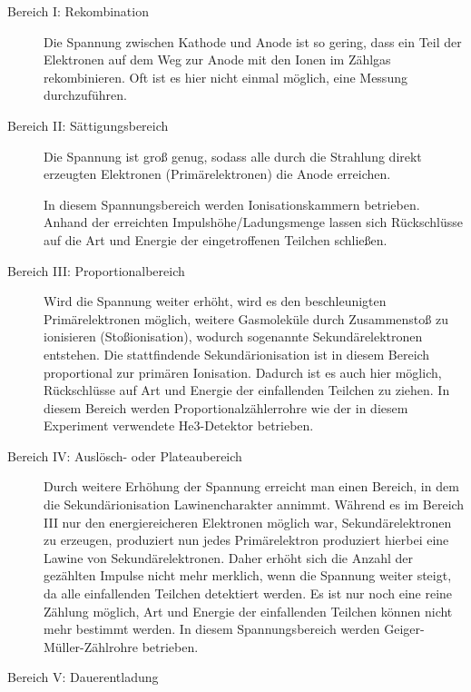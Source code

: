 \begin{description}
	\item[Bereich I: Rekombination] Die Spannung zwischen Kathode und Anode ist so gering, dass ein Teil der Elektronen auf dem Weg zur Anode mit den Ionen im Zählgas rekombinieren. Oft ist es hier nicht einmal möglich, eine Messung durchzuführen.  
	
\end{description}
\begin{description}

	\item[Bereich II: Sättigungsbereich] Die Spannung ist groß genug, sodass alle durch die Strahlung direkt erzeugten Elektronen (Primärelektronen) die Anode erreichen. 
	
	
	In diesem Spannungsbereich werden Ionisationskammern betrieben. Anhand der erreichten Impulshöhe/Ladungsmenge lassen sich Rückschlüsse auf die Art und Energie der eingetroffenen Teilchen schließen. 
	
	\item[Bereich III: Proportionalbereich] Wird die Spannung weiter erhöht, wird es den beschleunigten Primärelektronen möglich, weitere Gasmoleküle durch Zusammenstoß zu ionisieren (Stoßionisation), wodurch sogenannte Sekundärelektronen entstehen. Die stattfindende Sekundärionisation ist in diesem Bereich proportional zur primären Ionisation. Dadurch ist es auch hier möglich, Rückschlüsse auf Art und Energie der einfallenden Teilchen zu ziehen. In diesem Bereich werden Proportionalzählerrohre wie der in diesem Experiment verwendete He3-Detektor betrieben.
	
	\item [Bereich IV: Auslösch- oder Plateaubereich] Durch weitere Erhöhung der Spannung erreicht man einen Bereich, in dem die Sekundärionisation Lawinencharakter annimmt. Während es im Bereich III nur den energiereicheren Elektronen möglich war, Sekundärelektronen zu erzeugen, produziert nun jedes Primärelektron produziert hierbei eine Lawine von Sekundärelektronen. Daher erhöht sich die Anzahl der gezählten Impulse nicht mehr merklich, wenn die Spannung weiter steigt, da alle einfallenden Teilchen detektiert werden. Es ist nur noch eine reine Zählung möglich, Art und Energie der einfallenden Teilchen können nicht mehr bestimmt werden. In diesem Spannungsbereich werden Geiger-Müller-Zählrohre betrieben. 
	\item [Bereich V: Dauerentladung]
\end{description}

